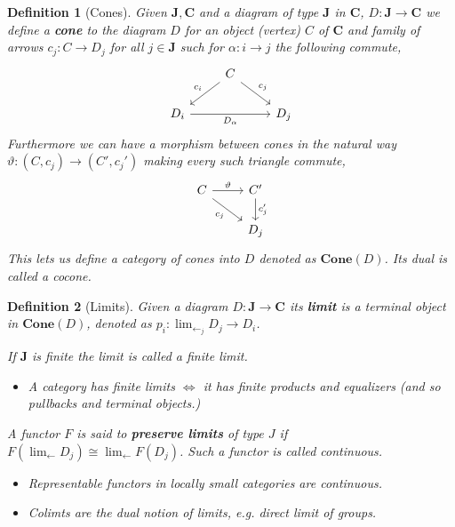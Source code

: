 \documentclass[12pt]{article}
\numberwithin{equation}{section}
\newtheorem{definition}{Definition}[section]
\begin{document}
\begin{appendices}
		\begin{definition}[Cones]
			Given $\mathbf{J}, \mathbf{C}$ and a diagram of type $\mathbf{J}$ in $\mathbf{C}$, $D: \mathbf{J} \to \mathbf{C}$ we define a \textbf{cone} to the diagram $D$ for an object (vertex) $C$ of $\mathbf{C}$ and family of arrows $c_j:C \to D_j$ for all $j \in \mathbf{J}$ such for $\alpha: i \to j$ the following commute,
			\[\begin{tikzcd}
				& C \\
				{D_i} && {D_j}
				\arrow["{c_i}"', from=1-2, to=2-1]
				\arrow["{c_j}", from=1-2, to=2-3]
				\arrow["{D_\alpha}"', from=2-1, to=2-3]
			\end{tikzcd}\]
			Furthermore we can have a morphism between cones in the natural way $\vartheta: (C, c_j) \to (C', c_j')$ making every such triangle commute,
			\[\begin{tikzcd}
				C & {C'} \\
				& {D_j}
				\arrow["\vartheta", from=1-1, to=1-2]
				\arrow["{c_j'}", from=1-2, to=2-2]
				\arrow["{c_j}"', from=1-1, to=2-2]
			\end{tikzcd}\]
			This lets us define a category of cones into $D$ denoted as $\mathbf{Cone}(D)$. Its dual is called a cocone.
			
		\end{definition}
		\begin{definition}[Limits]
			Given a diagram $D: \mathbf{J} \to \mathbf{C}$ its \textbf{limit} is a terminal object in $\mathbf{Cone}(D)$, denoted as $p_i: \lim_{\leftarrow_j}D_j \to D_i$.
			
			If $\mathbf{J}$ is finite the limit is called a finite limit.	
			
			\begin{itemize}
				\item A category has finite limits $\iff $ it has finite products and equalizers (and so pullbacks and terminal objects.)
			\end{itemize}
			
			A functor $F$ is said to \textbf{preserve limits} of type $J$ if $F(\lim_{\leftarrow} D_j) \cong \lim_\leftarrow F(D_j)$. Such a functor is called continuous.
			
			\begin{itemize}
				\item Representable functors in locally small categories are continuous.
				\item Colimts are the dual notion of limits, e.g. direct limit of groups.
			\end{itemize}
		\end{definition}
		

\end{appendices}
\end{document}

